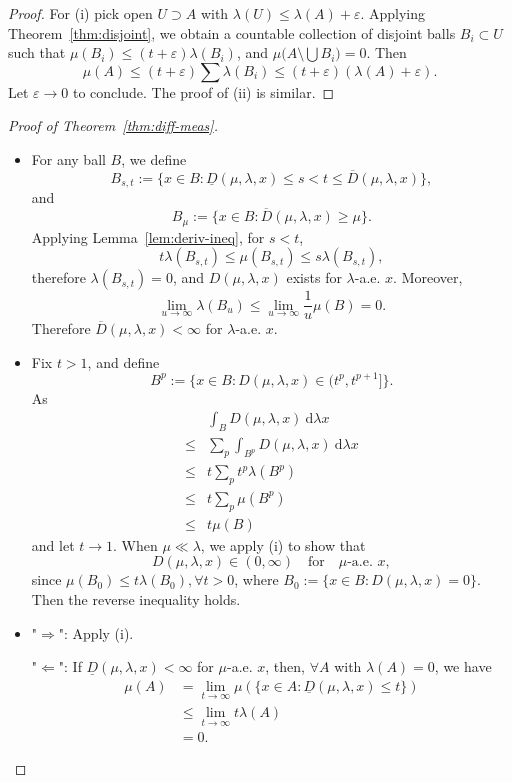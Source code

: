 \begin{proof}
For (i) pick open $U\supset A$ with $\lambda(U)\le\lambda(A)+\varepsilon$. Applying Theorem~\ref{thm:disjoint}, we obtain a countable collection of disjoint balls $B_{i}\subset U$ such that
$\mu(B_{i})\le (t+\varepsilon)\lambda(B_{i})$, and $ \mu\bigl(A\setminus\bigcup B_{i}\bigr)=0.$ Then
$$\mu(A)\le (t+\varepsilon)\sum\lambda(B_{i})\le (t+\varepsilon)(\lambda(A)+\varepsilon).$$
Let $\varepsilon\to 0$ to conclude. The proof of (ii) is similar.
\end{proof}

\begin{proof}[Proof of Theorem~\ref{thm:diff-meas}]
\begin{itemize}
    \item[(i)] For any ball $B$, we define 
    $$
    B_{s,t}:=\{ x \in B:\underline{D}(\mu,\lambda,x)\leq s<t\leq\overline{D}(\mu,\lambda,x) \},$$and $$B_{\mu}:=\{ x \in B: \overline{D}(\mu,\lambda,x)\geq \mu \}.
    $$
    Applying Lemma~\ref{lem:deriv-ineq}, for $s<t$, 
    $$
    t\lambda(B_{s,t})\leq \mu(B_{s,t})\leq s\lambda(B_{s,t}),
    $$
    therefore $\lambda(B_{s,t})=0$, and $D(\mu,\lambda,x)$ exists for $\lambda$-a.e. $x$. Moreover, 
    $$
    \lim_{ u \to \infty } \lambda(B_{u})\leq \lim_{ u \to \infty } \frac{1}{u}\mu(B)=0. $$
    Therefore $\overline{D}(\mu,\lambda,x)<\infty$ for $\lambda$-a.e. $x$.

    \item[(ii)] Fix $t>1$, and define 
    $$
    B^{p}:=\{ x \in B: D(\mu,\lambda,x)\in(t^{p},t^{p+1}] \}.
    $$
    As 
    $$
    \begin{aligned} 
        & \int _{B}D (\mu,\lambda,x)\ \mathrm{d}\lambda x \\
        \leq & \sum _{p}\int _{B^{p}}D(\mu,\lambda,x) \ \mathrm{d}\lambda x \\
        \leq  & t \sum _{p}t^{p}\lambda(B^{p})\\
        \leq & t\sum _{p}\mu(B^{p}) \\ 
        \leq & t\mu(B)
    \end{aligned}
    $$
    and let $t\to 1$.
    When $\mu\ll \lambda$, we apply (i) to show that 
    $$
    D(\mu,\lambda,x)\in(0,\infty)\quad\text{for}\quad\mu \text{-a.e. }x,
    $$
    since $\mu(B_{0})\leq t\lambda(B_{0}), \forall t>0$, where $B_{0}:=\{ x \in B:D(\mu,\lambda,x)=0 \}.$ Then the reverse inequality holds.
    
    \item[(iii)] 
    "$\Rightarrow$": Apply (i).
    
    "$\Leftarrow$": If $\underline{D}(\mu,\lambda,x)<\infty$ for $\mu$-a.e. $x$, then, $\forall A$ with $\lambda (A)=0$, we have 
    $$
    \begin{aligned}
        \mu(A) & =\lim_{ t \to \infty } \mu(\{ x \in A:\underline{D}(\mu,\lambda,x)\leq t \})\\ & \leq \lim_{ t \to \infty } t\lambda (A)\\ & =0.
    \end{aligned}
    $$
\end{itemize}
\end{proof}

